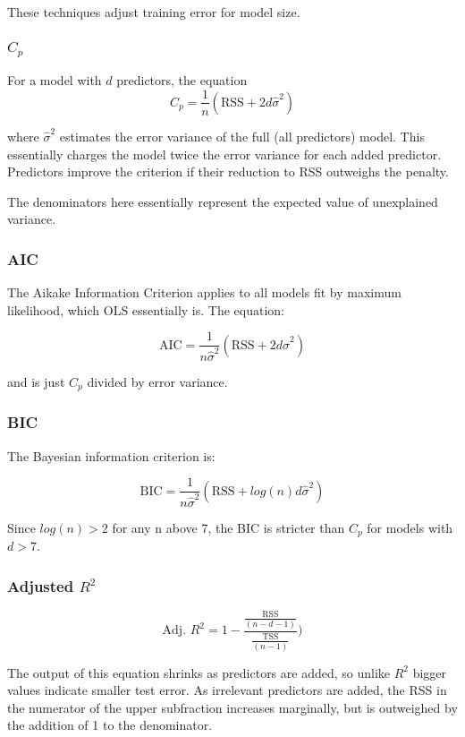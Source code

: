 \documentclass[
]{article}
\begin{document}
These techniques adjust training error for model size.

\hypertarget{c_p}{%
\subsubsection{\texorpdfstring{\(C_p\)}{C\_p}}\label{c_p}}

For a model with \(d\) predictors, the equation
\[C_p=\frac{1}{n}(\text{RSS}+2d\hat\sigma^2)\]

where \(\hat\sigma^2\) estimates the error variance of the full (all
predictors) model. This essentially charges the model twice the error
variance for each added predictor. Predictors improve the criterion if
their reduction to RSS outweighs the penalty.

The denominators here essentially represent the expected value of
unexplained variance.

\hypertarget{aic}{%
\subsubsection{AIC}\label{aic}}

The Aikake Information Criterion applies to all models fit by maximum
likelihood, which OLS essentially is. The equation:

\[\text{AIC}=\frac{1}{n\hat\sigma^2}(\text{RSS}+2d\hat\sigma^2)\]

and is just \(C_p\) divided by error variance.

\hypertarget{bic}{%
\subsubsection{BIC}\label{bic}}

The Bayesian information criterion is:

\[\text{BIC}=\frac{1}{n\hat\sigma^2}(\text{RSS}+log(n)d\hat\sigma^2) \]

Since \(log(n) >2\) for any n above 7, the BIC is stricter than \(C_p\)
for models with \(d>7\).

\hypertarget{adjusted-r2}{%
\subsubsection{\texorpdfstring{Adjusted
\(R^2\)}{Adjusted R\^{}2}}\label{adjusted-r2}}

\[\text{Adj. }R^2 = 1 - \frac{\frac{\text{RSS}}{(n-d-1)}}{\frac{\text{TSS}}{(n-1)}})\]

The output of this equation shrinks as predictors are added, so unlike
\(R^2\) bigger values indicate smaller test error. As irrelevant
predictors are added, the RSS in the numerator of the upper subfraction
increases marginally, but is outweighed by the addition of 1 to the
denominator.
\end{document}
